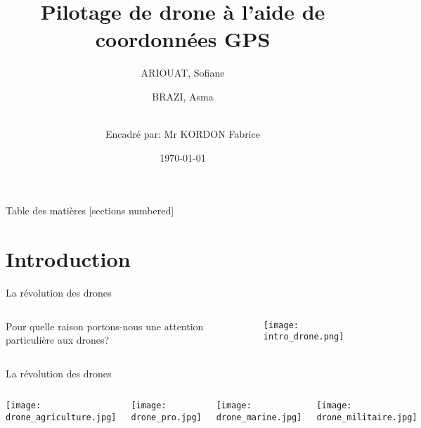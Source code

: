 \documentclass[french]{beamer}
\title{Pilotage de drone à l'aide de coordonnées GPS}
\author{
  ARIOUAT, Sofiane\\
  \and
  BRAZI, Asma\\
  \and
  \\Encadré par: Mr KORDON Fabrice\\
}
\institute{Sorbonne Université}
\date{\today}
\begin{document}
\maketitle

\begin{frame}{Table des matières}
  [sections numbered]
  \tableofcontents[hideallsubsections]
  
\end{frame}

\section{Introduction}

\begin{frame}[fragile]{La révolution des drones}
 \begin{columns}
\begin{column}{0.5\textwidth}
   Pour quelle raison portons-nous une attention particulière aux drones?
\end{column}
\begin{column}{0.5\textwidth} 
    \begin{center}
     \texttt{[image: intro\_drone.png]}
     \end{center}
\end{column}
\end{columns}
\end{frame}

\begin{frame}[fragile]{La révolution des drones}

\begin{columns}
\begin{minipage}[c][0.4\textheight][c]{\linewidth}
  \centering
  
  \texttt{[image: drone\_agriculture.jpg]} 
\end{minipage}
\begin{minipage}[c][0.4\textheight][c]{\linewidth}
  \centering
  \texttt{[image: drone\_pro.jpg]} 
\end{minipage}
\begin{minipage}[c][0.4\textheight][c]{\linewidth}
  \centering
  \texttt{[image: drone\_marine.jpg]} 
\end{minipage}
\begin{minipage}[c][0.4\textheight][c]{\linewidth}
  \centering
  \texttt{[image: drone\_militaire.jpg]} 
\end{minipage}
\end{columns}

\end{frame}
\end{document}
